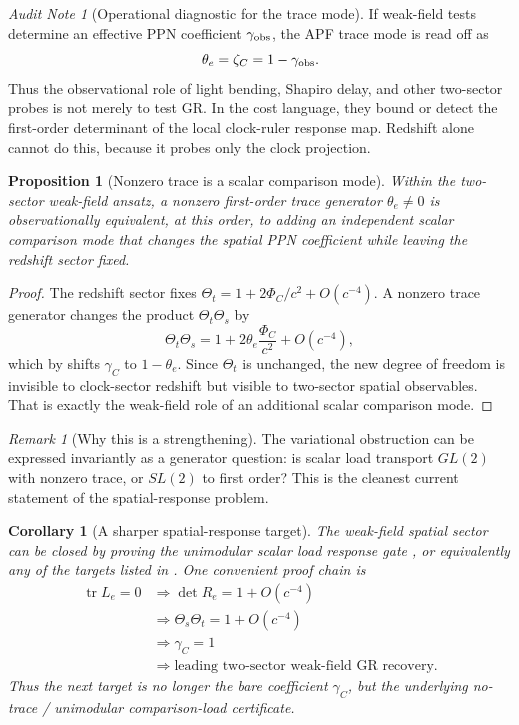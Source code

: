 \documentclass[11pt]{article}
\newtheorem{proposition}[theorem]{Proposition}
\newtheorem{corollary}[theorem]{Corollary}
\theoremstyle{remark}
\newtheorem{remark}[theorem]{Remark}
\newtheorem{audit}[theorem]{Audit Note}
\begin{document}
\begin{audit}[Operational diagnostic for the trace mode]
If weak-field tests determine an effective PPN coefficient \(\gamma_{\rm obs}\), the APF trace mode is read off as
\[
        \theta_e=\zeta_C=1-\gamma_{\rm obs}.
\]
Thus the observational role of light bending, Shapiro delay, and other two-sector probes is not merely to test GR.  In the cost language, they bound or detect the first-order determinant of the local clock-ruler response map.  Redshift alone cannot do this, because it probes only the clock projection.
\end{audit}

\begin{proposition}[Nonzero trace is a scalar comparison mode]
\label{prop:nonzero-trace-scalar-mode}
Within the two-sector weak-field ansatz, a nonzero first-order trace generator \(\theta_e\neq0\) is observationally equivalent, at this order, to adding an independent scalar comparison mode that changes the spatial PPN coefficient while leaving the redshift sector fixed.
\end{proposition}

\begin{proof}
The redshift sector fixes \(\Theta_t=1+2\Phi_C/c^2+O(c^{-4})\).  A nonzero trace generator changes the product \(\Theta_t\Theta_s\) by
\[
        \Theta_t\Theta_s
        =1+2\theta_e\frac{\Phi_C}{c^2}+O(c^{-4}),
\]
which by  shifts \(\gamma_C\) to \(1-\theta_e\).  Since \(\Theta_t\) is unchanged, the new degree of freedom is invisible to clock-sector redshift but visible to two-sector spatial observables.  That is exactly the weak-field role of an additional scalar comparison mode.
\end{proof}

\begin{remark}[Why this is a strengthening]
The variational obstruction can be expressed invariantly as a generator question: is scalar load transport \(GL(2)\) with nonzero trace, or \(SL(2)\) to first order?  This is the cleanest current statement of the spatial-response problem.
\end{remark}

\begin{corollary}[A sharper spatial-response target]
\label{cor:sharper-target}
The weak-field spatial sector can be closed by proving the unimodular scalar load response gate , or equivalently any of the targets listed in .  One convenient proof chain is
\[
\begin{aligned}
        \operatorname{tr}L_e=0
        &\Longrightarrow
        \det R_e=1+O(c^{-4}) \\
        &\Longrightarrow
        \Theta_s\Theta_t=1+O(c^{-4}) \\
        &\Longrightarrow
        \gamma_C=1 \\
        &\Longrightarrow
        \text{leading two-sector weak-field GR recovery}.
\end{aligned}
\]
Thus the next target is no longer the bare coefficient \(\gamma_C\), but the underlying no-trace / unimodular comparison-load certificate.
\end{corollary}
\end{document}
